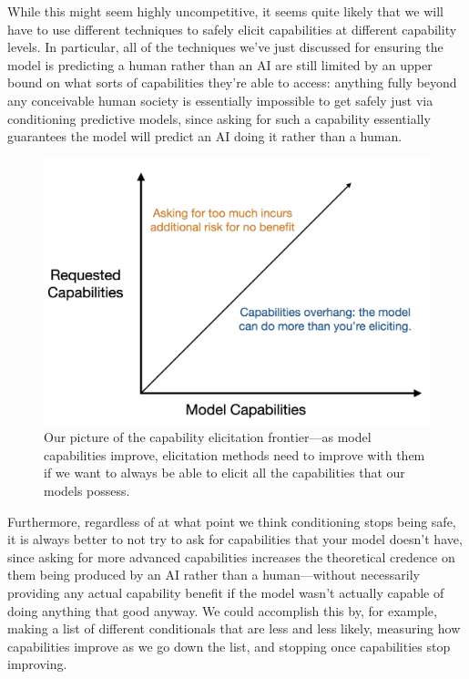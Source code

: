 \documentclass[
  onecolumn,
  natbib,
]{miri-tech-article}
\begin{document}
While this might seem highly uncompetitive, it seems quite likely that we will have to use different techniques to safely elicit capabilities at different capability levels. In particular, all of the techniques we've just discussed for ensuring the model is predicting a human rather than an AI are still limited by an upper bound on what sorts of capabilities they're able to access: anything fully beyond any conceivable human society is essentially impossible to get safely just via conditioning predictive models, since asking for such a capability essentially guarantees the model will predict an AI doing it rather than a human.

\begin{figure}[h!]
  \centering
  \includegraphics[width=\textwidth]{UARylfz.png}
  \caption{Our picture of the capability elicitation frontier---as model capabilities improve, elicitation methods need to improve with them if we want to always be able to elicit all the capabilities that our models possess.}
\end{figure}

Furthermore, regardless of at what point we think conditioning stops being safe, it is always better to not try to ask for capabilities that your model doesn't have, since asking for more advanced capabilities increases the theoretical credence on them being produced by an AI rather than a human---without necessarily providing any actual capability benefit if the model wasn't actually capable of doing anything that good anyway. We could accomplish this by, for example, making a list of different conditionals that are less and less likely, measuring how capabilities improve as we go down the list, and stopping once capabilities stop improving.
\end{document}
